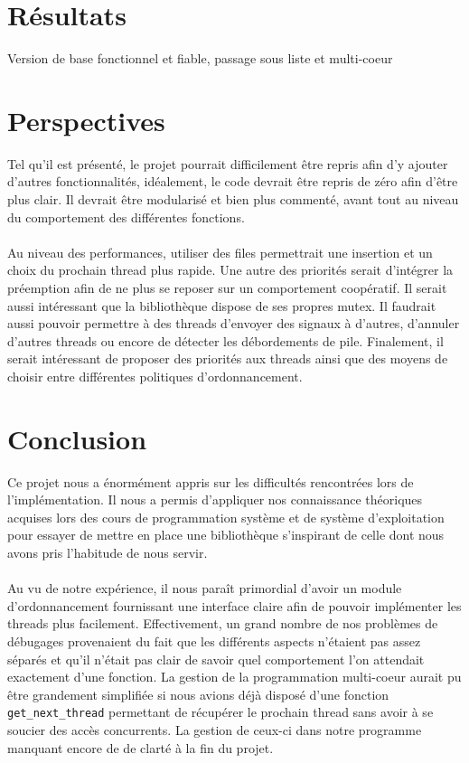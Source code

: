\documentclass{article}
\begin{document}
	\section{Résultats}
	Version de base fonctionnel et fiable, passage sous liste et
    multi-coeur

	\section{Perspectives}
    Tel qu'il est présenté, le projet pourrait difficilement être repris
    afin d'y ajouter d'autres fonctionnalités, idéalement, le code devrait
    être repris de zéro afin d'être plus clair. Il devrait être modularisé et
    bien plus commenté, avant tout au niveau du comportement des différentes
    fonctions.
    \paragraph{}
    Au niveau des performances, utiliser des files permettrait une insertion
    et un choix du prochain thread plus rapide. Une autre des priorités
    serait d'intégrer la préemption afin de ne plus se reposer sur un
    comportement coopératif. Il serait aussi intéressant que la bibliothèque
    dispose de ses propres mutex. Il faudrait aussi pouvoir permettre à des
    threads d'envoyer des signaux à d'autres, d'annuler d'autres threads ou
    encore de détecter les débordements de pile. Finalement, il serait
    intéressant de proposer des priorités aux threads ainsi que des moyens
    de choisir entre différentes politiques d'ordonnancement.

	\section{Conclusion}
    Ce projet nous a énormément appris sur les difficultés rencontrées lors
    de l'implémentation. Il nous a permis d'appliquer nos connaissance
    théoriques acquises lors des cours de programmation système et de système
    d'exploitation pour essayer de mettre en place une bibliothèque
    s'inspirant de celle dont nous avons pris l'habitude de nous servir.
    \paragraph{}
    Au vu de notre expérience, il nous paraît primordial d'avoir un module
    d'ordonnancement fournissant une interface claire afin de pouvoir
    implémenter les threads plus facilement. Effectivement, un grand nombre
    de nos problèmes de débugages provenaient du fait que les différents
    aspects n'étaient pas assez séparés et qu'il n'était pas clair de savoir
    quel comportement l'on attendait exactement d'une fonction. La gestion
    de la programmation multi-coeur aurait pu être grandement simplifiée si
    nous avions déjà disposé d'une fonction \verb!get_next_thread!
    permettant de récupérer le prochain thread sans avoir à se soucier des
    accès concurrents. La gestion de ceux-ci dans notre programme
    manquant encore de de clarté à la fin du projet.
\end{document}

